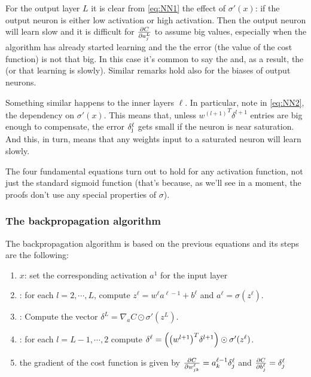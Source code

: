 For the output layer $L$ it is clear from \autoref{eq:NN1} the effect of $\sigma'(x)$: if the output neuron is either low activation or high activation. Then the output neuron will learn slow and it is difficult for $\frac{\mathrm{\partial} C}{\mathrm{\partial} a_j^L}$ to assume big values, especially when the algorithm has already started learning and the the error (the value of the cost function) is not that big. In this case it's common to say the  and, as a result, the  (or that learning is slowly). Similar remarks hold also for the biases of output neurons.

Something similar happens to the inner layers $\ell$. In particular, note in \autoref{eq:NN2}, the dependency on $\sigma'(x)$. This means that, unless ${w^{(l+1)}}^T \delta^{l+1}$ entries are big enough to compensate, the error $\mathrm{\delta^\ell_j}$ gets small if the neuron is near saturation. And this, in turn, means that any weights input to a saturated neuron will learn slowly.

The four fundamental equations turn out to hold for any activation function, not just the standard sigmoid function (that's because, as we'll see in a moment, the proofs don't use any special properties of $\sigma$).

\subsubsection{The backpropagation algorithm}
The backpropagation algorithm is based on the previous equations and its steps are the following:
\begin{enumerate}
\item {} $x$: set the corresponding activation $a^1$ for the input layer
\item {}: for each $l=2,\cdots, L$, compute $z^\ell = w^\ell a^{\ell-1} +b^\ell$ and $a^\ell = \sigma(z^\ell)$.
\item {}: Compute the vector $\delta^L= \nabla_a C \odot \sigma'(z^L)$.
\item {}: for each $l=L-1, \cdots, 2$ compute $\delta^\ell=\br{\br{w^{l+1}}^T\delta^{l+1}}\odot \sigma'(z^\ell)$.
\item {} the gradient of the cost function is given by $\frac{\mathrm{\partial} C}{\mathrm{\partial} w_{jk}^\ell}=a_k^{\ell-1}\delta_j^\ell$ and $\frac{\mathrm{\partial} C}{\mathrm{\partial} b_{j}^\ell} = \delta_j^\ell$
\end{enumerate}

